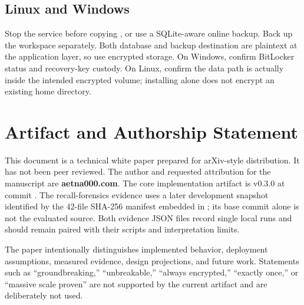 \subsection{Linux and Windows}

Stop the service before copying , or use a SQLite-aware online backup. Back up the workspace separately. Both database and backup destination are plaintext at the application layer, so use encrypted storage. On Windows, confirm BitLocker status and recovery-key custody. On Linux, confirm the data path is actually inside the intended encrypted volume; installing  alone does not encrypt an existing home directory.

\section{Artifact and Authorship Statement}
\label{app:artifact}

This document is a technical white paper prepared for arXiv-style distribution. It has not been peer reviewed. The author and requested attribution for the manuscript are \textbf{aetna000.com}. The core implementation artifact is \system{} v0.3.0 at commit . The recall-forensics evidence uses a later development snapshot identified by the 42-file SHA-256 manifest embedded in ; its base commit alone is not the evaluated source. Both evidence JSON files record single local runs and should remain paired with their scripts and interpretation limits.

The paper intentionally distinguishes implemented behavior, deployment assumptions, measured evidence, design projections, and future work. Statements such as ``groundbreaking,'' ``unbreakable,'' ``always encrypted,'' ``exactly once,'' or ``massive scale proven'' are not supported by the current artifact and are deliberately not used.
